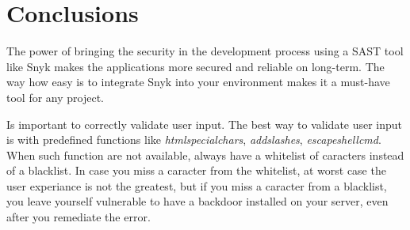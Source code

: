 \documentclass{article}
\begin{document}
\section{Conclusions}
\label{}
\par The power of bringing the security in the development process using a SAST tool like Snyk makes the applications more secured and reliable on long-term. The way how easy is to integrate Snyk into your environment makes it a must-have tool for any project.

Is important to correctly validate user input. The best way to validate user input is with predefined functions like \textit{htmlspecialchars}, \textit{addslashes}, \textit{escapeshellcmd}.
When such function are not available, always have a whitelist of caracters instead of a blacklist.
In case you miss a caracter from the whitelist, at worst case the user experiance is not the greatest, but if you miss a caracter from a blacklist, you leave yourself vulnerable to have a backdoor installed on your server, even after you remediate the error.



\end{document}
